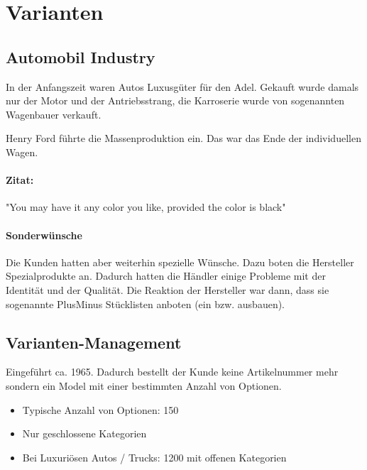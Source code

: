 \newpage
\section{Varianten}

\subsection{Automobil Industry}
In der Anfangszeit waren Autos Luxusgüter für den Adel. Gekauft wurde damals nur der Motor und der Antriebsstrang, die Karroserie wurde von sogenannten Wagenbauer verkauft.


Henry Ford führte die Massenproduktion ein. Das war das Ende der individuellen Wagen.

\paragraph{Zitat:}
"You may have it any color you like, provided the color is black"


\paragraph{Sonderwünsche}
Die Kunden hatten aber weiterhin spezielle Wünsche. Dazu boten die Hersteller Spezialprodukte an. Dadurch hatten die Händler einige Probleme mit der Identität und der Qualität. Die Reaktion der Hersteller war dann, dass sie sogenannte PlusMinus Stücklisten anboten (ein bzw. ausbauen).

\newpage
\subsection{Varianten-Management}
Eingeführt ca. 1965. Dadurch bestellt der Kunde keine Artikelnummer mehr sondern ein Model mit einer bestimmten Anzahl von Optionen.

\begin{itemize}
\item Typische Anzahl von Optionen: 150
\item Nur geschlossene Kategorien
\item Bei Luxuriösen Autos / Trucks: 1200 mit offenen Kategorien
\end{itemize}

